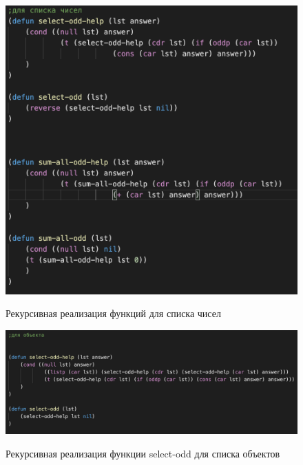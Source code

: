 \documentclass[a4paper,12pt]{article}
\begin{document}
 	\begin{figure}[h!]
 		\begin{center}
 			{\includegraphics[scale = 0.8]{6.15.1.png}}
 			\label{ris:6.15.1}
 		\end{center}
 	\caption{Рекурсивная реализация функций для списка чисел}
 	\end{figure}
 	
 	\newpage
 	
 	\begin{figure}[h!]
 		\begin{center}
 			{\includegraphics[scale = 0.7]{6.15.2.png}}
 			\label{ris:6.15.2}
 		\end{center}
 	\caption{Рекурсивная реализация функции select-odd для списка объектов}
 	\end{figure}
 	
\end{document}
